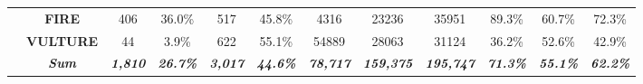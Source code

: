 \begin{table}[htbp]
{\begin{tabular}{lccccccccccc}
    &  \textbf{FIRE} & 406   & 36.0\% & 517   & 45.8\% & 4316  & 23236 & 35951 & 89.3\% & 60.7\% & 72.3\% \\
    & \cellcolor[rgb]{0.89, 0.89, 0.89} \textbf{VULTURE} & \cellcolor[rgb]{0.89, 0.89, 0.89} 44 & \cellcolor[rgb]{0.89, 0.89, 0.89} 3.9\% & \cellcolor[rgb]{0.89, 0.89, 0.89} 622 & \cellcolor[rgb]{0.89, 0.89, 0.89} 55.1\% & \cellcolor[rgb]{0.89, 0.89, 0.89} 54889 & \cellcolor[rgb]{0.89, 0.89, 0.89} 28063 & \cellcolor[rgb]{0.89, 0.89, 0.89} 31124 & \cellcolor[rgb]{0.89, 0.89, 0.89} 36.2\% & \cellcolor[rgb]{0.89, 0.89, 0.89} 52.6\% & \cellcolor[rgb]{0.89, 0.89, 0.89} 42.9\% \\
    &  \textit{\textbf{Sum}} & \textit{\textbf{1,810}} & \textit{\textbf{26.7\%}} & \textit{\textbf{3,017}} & \textit{\textbf{44.6\%}} & \textit{\textbf{78,717}} & \textit{\textbf{159,375}} & \textit{\textbf{195,747}} & \textit{\textbf{71.3\%}} & \textit{\textbf{55.1\%}} & \textit{\textbf{62.2\%}} \\ 
    \bottomrule 
    
    \end{tabular}
}
\end{table}

